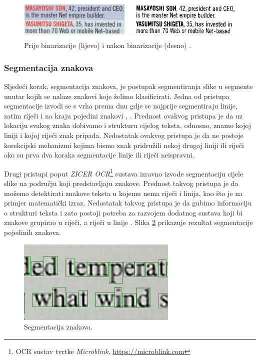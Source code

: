 \documentclass[times, utf8, zavrsni]{fer}
\begin{document}
\begin{figure}[htb]
    \centering
    \includegraphics[height=2cm]{images/binarization.png}
    \caption{Prije binarizacije (lijevo) i nakon binarizacije (desno) \citep{Vynckier:2018:HowOcrWorks}.}
    \label{fig:binarization}
\end{figure}

\subsubsection{Segmentacija znakova}
\label{subsubsec:segmentacija}

Sljedeći korak, segmentacija znakova, je postupak segmentiranja slike u segmente unutar kojih se nalaze znakovi
koje želimo klasificirati. Jedna od pristupa segmentacije izvodi se s vrha prema dnu gdje se najprije
segmentiraju linije, zatim riječi i na kraju pojedini znakovi \citep{Jurin:2017:Master}, \citep{Vynckier:2018:HowOcrWorks}.
Prednost ovakvog pristupa je da uz lokaciju svakog znaka dobivamo i strukturu cijelog teksta, odnosno, znamo kojoj
liniji i kojoj riječi znak pripada. Nedostatak ovakvog pristupa je da ne postoje korekcijski mehanizmi kojima bismo
znak pridružili nekoj drugoj liniji ili riječi ako su prva dva koraka segmentacije linije ili riječi neispravni. \citep{Jurin:2017:Master}

Drugi pristupi poput \emph{ZICER OCR}\footnote{OCR sustav tvrtke \emph{Microblink}, \url{https://microblink.com}} sustava izravno
izvode segmentaciju cijele slike na području koji predstavljaju znakove. Prednost takvog pristupa je da
možemo detektirati znakove teksta u kojemu nema riječi i linija, kao što je na primjer matematički izraz.
Nedostatak takvog pristupa je da gubimo informaciju o strukturi teksta i zato postoji potreba za razvojem dodatnog sustava koji bi znakove
grupirao u riječi, a riječi u linije \citep{Jurin:2017:Master}.
Slika \ref{fig:segmentation} prikazuje rezultat segmentacije pojedinih znakova.

\begin{figure}[htb]
    \centering
    \includegraphics[height=4cm]{images/segmentation.png}
    \caption{Segmentacija znakova.}
    \label{fig:segmentation}
\end{figure}
\end{document}
